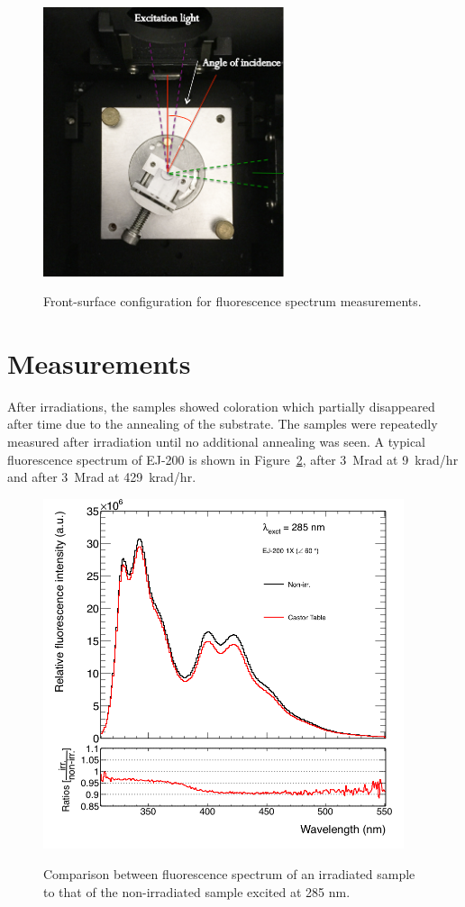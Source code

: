 \documentclass[review]{elsarticle}
\begin{document}


\begin{figure}[!ht]
	\centering
	\caption{Front-surface configuration for fluorescence spectrum measurements.}
	\includegraphics[width=200pt]{./figures/sample_placement.png}
	\label{fig:sample_placement}
\end{figure}

\section{Measurements} 
After irradiations, the samples showed coloration which partially disappeared after time due to the annealing of the substrate. 
The samples were repeatedly measured after irradiation until no additional annealing was seen. 
A typical fluorescence spectrum of EJ-200 is shown in Figure~\ref{fig:EJ200SP-1P-exc285}, 
after 3~Mrad at 9~krad/hr and after 3~Mrad at 429~krad/hr.

\begin{figure}[!htb]
	\centering
	\caption{Comparison between fluorescence spectrum of an irradiated sample to that of the non-irradiated sample excited at 285 nm.}
	\includegraphics[width=300pt]{./figures/EJ200-1X-exc285.png}
	\label{fig:EJ200SP-1P-exc285}
\end{figure}
\end{document}
